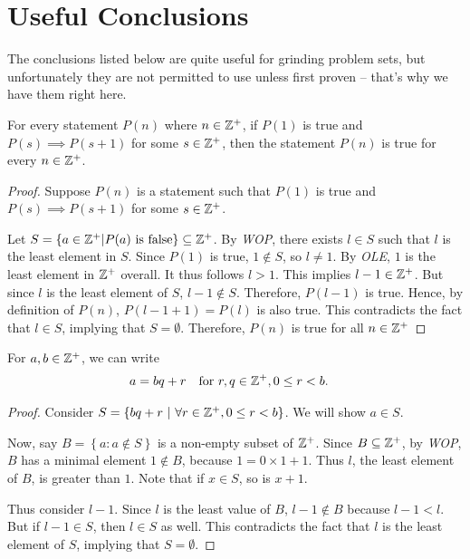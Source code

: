 \section{Useful Conclusions}

The conclusions listed below are quite useful for grinding problem sets, but unfortunately they are not permitted to use unless first proven – that's why we have them right here.

\begin{theorem**}[Induction]
For every statement $P(n)$ where $n \in \mathbb{Z}^+$, if $P(1)$ is true and $P(s)\implies P(s+1)$ for some $s \in \mathbb{Z}^+$, then the statement $P(n)$ is true for every $n \in \mathbb{Z}^+$.
\end{theorem**}
\begin{proof}
    Suppose $P(n)$ is a statement such that $P(1)$ is true and $P(s)\implies P(s+1)$ for some $s \in \mathbb{Z}^+$.
    
    Let $S = \left\{ a\in \mathbb{Z}^+ \vert P(a) \text{ is false} \right\} \subseteq \mathbb{Z}^+$. By \textit{WOP}, there exists $l \in S$ such that $l$ is the least element in $S$. Since $P(1)$ is true, $1 \notin S$, so $l \neq 1$. By \textit{OLE}, $1$ is the least element in $\mathbb{Z}^+$ overall. It thus follows $l > 1$. This implies $l-1 \in \mathbb{Z}^+$. But since $l$ is the least element of $S$, $l-1 \notin S$. Therefore, $P(l-1)$ is true. Hence, by definition of $P(n)$, $P(l-1+1) = P(l)$ is also true. This contradicts the fact that $l \in S$, implying that $S = \emptyset$. Therefore, $P(n)$ is true for all $n \in \mathbb{Z}^+$
\end{proof}
\begin{theorem**}
For $a, b \in \mathbb{Z}^{+}$, we can write
\begin{align*}
    a &= bq+r \text{\quad for $r, q \in \mathbb{Z}^{+}, 0\leq r < b$}.
\end{align*}
\end{theorem**}
\begin{proof}
    Consider $S = \left\{bq+r\ \vert\ \forall r \in \Zplus, 0\leq r < b\right\}$. We will show $a \in S$.

    Now, say $B = \left\{ a: a \notin S \right\}$ is a non-empty subset of $\mathbb{Z}^{+}$. Since $B\subseteq \mathbb{Z}^{+}$, by \textit{WOP}, $B$ has a minimal element $1 \notin B$, because $1 = 0\times 1 + 1$. Thus $l$, the least element of $B$, is greater than $1$. Note that if $x \in S$, so is $x+1$.

    Thus consider $l - 1$. Since $l$ is the least value of $B$, $l-1 \notin B$ because $l-1 < l$. But if $l-1 \in S$, then $l \in S$ as well. This contradicts the fact that $l$ is the least element of $S$, implying that $S = \emptyset$.
\end{proof}

